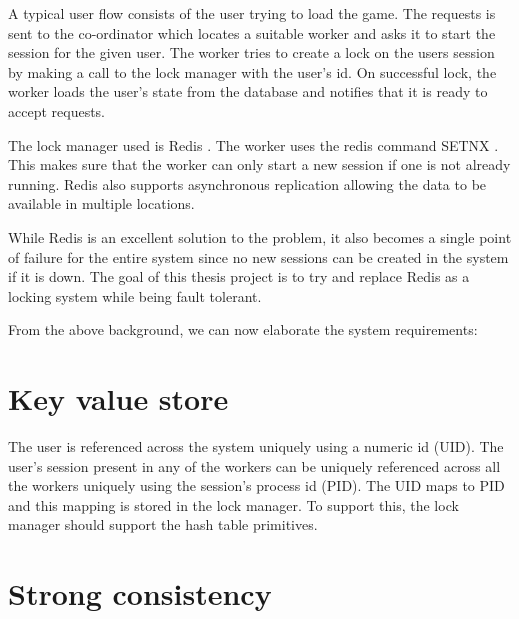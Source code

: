 A typical user flow consists of the user trying to load the game. The requests
is sent to the co-ordinator which locates a suitable worker and asks it to
start the session for the given user. The worker tries to create a lock on
the users session by making a call to the lock manager with the user's id.
On successful lock, the worker loads the user's state from the database and
notifies that it is ready to accept requests.

The lock manager used is Redis \citep{redis}%
. The worker uses the redis command SETNX%
. This makes sure that the worker can only start a new session if one is 
not already running. Redis also supports asynchronous replication allowing the 
data to be available in multiple locations.

While Redis is an excellent solution to the problem, it also becomes a single
point of failure for the entire system since no new sessions can be created in 
the system if it is down. The goal of this thesis project is to try and replace
Redis as a locking system while being fault tolerant.

From the above background, we can now elaborate the system requirements:

\section{Key value store}
\label{section:ml.kv.store}


The user is referenced across the system uniquely using a numeric id (UID). The 
user's session present in any of the workers can be uniquely referenced across 
all the workers uniquely using the session's process id (PID). The UID maps to
PID and this mapping is stored in the lock manager. To support this, the lock
manager should support the hash table primitives.

\section{Strong consistency}


